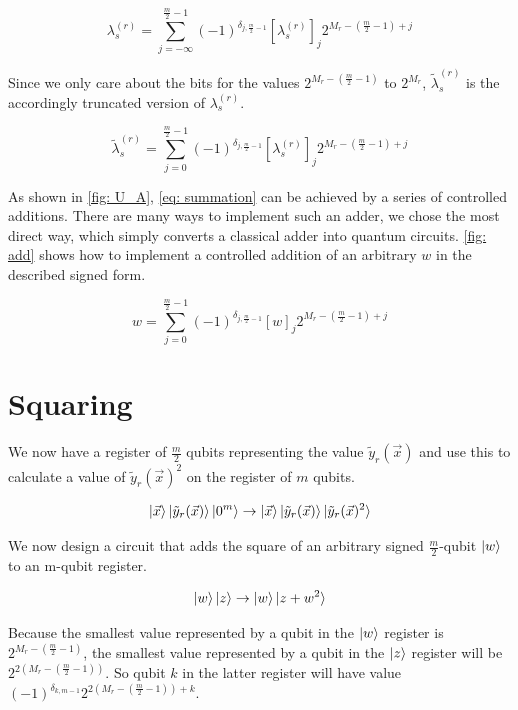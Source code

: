 \begin{equation}
    \lambda^{(r)}_s = \sum_{j = -\infty}^{\frac{m}{2} - 1} (-1)^{\delta_{j, \frac{m}{2} - 1}}[\lambda^{(r)}_s]_j2^{M_r - (\frac{m}{2} - 1) + j}
\end{equation}

Since we only care about the bits for the values $2^{M_r - (\frac{m}{2} - 1)}$ to $2^{M_r}$, $\tilde{\lambda}^{(r)}_s$ is the accordingly truncated version of $\lambda^{(r)}_s$.

\begin{equation}
    \tilde{\lambda}^{(r)}_s = \sum_{j = 0}^{\frac{m}{2} - 1} (-1)^{\delta_{j, \frac{m}{2} - 1}}[\lambda^{(r)}_s]_j2^{M_r - (\frac{m}{2} - 1) + j}
\end{equation}

As shown in \ref{fig: U_A}, \eqref{eq: summation} can be achieved by a series of controlled additions. There are many ways to implement such an adder, we chose the most direct way, which simply converts a classical adder into quantum circuits. \ref{fig: add} shows how to implement a controlled addition of an arbitrary $w$ in the described signed form.

\begin{equation}
    w = \sum_{j = 0}^{\frac{m}{2} - 1} (-1)^{\delta_{j, \frac{m}{2} - 1}}[w]_j2^{M_r - (\frac{m}{2} - 1) + j}
\end{equation}

\section{Squaring}

We now have a register of $\frac{m}{2}$ qubits representing the value $\tilde{y}_r(\vec{x})$ and use this to calculate a value of $\tilde{y}_r(\vec{x})^2$ on the register of $m$ qubits.

\begin{equation}
    \ket{\vec{x}}\ket{\tilde{y}_r(\vec{x})}\ket{0^m} \rightarrow \ket{\vec{x}}\ket{\tilde{y}_r(\vec{x})}\ket{\tilde{y}_r(\vec{x})^2} \label{eq: y^2}
\end{equation}

We now design a circuit that adds the square of an arbitrary signed $\frac{m}{2}$-qubit $\ket{w}$ to an m-qubit register.

\begin{equation}
    \ket{w}\ket{z} \rightarrow \ket{w}\ket{z + w^2}
\end{equation}

Because the smallest value represented by a qubit in the $\ket{w}$ register is $2^{M_r - (\frac{m}{2} - 1)}$, the smallest value represented by a qubit in the $\ket{z}$ register will be $2^{2(M_r - (\frac{m}{2} - 1))}$. So qubit $k$ in the latter register will have value $(-1)^{\delta_{k, m - 1}}2^{2(M_r - (\frac{m}{2} - 1)) + k}$.

